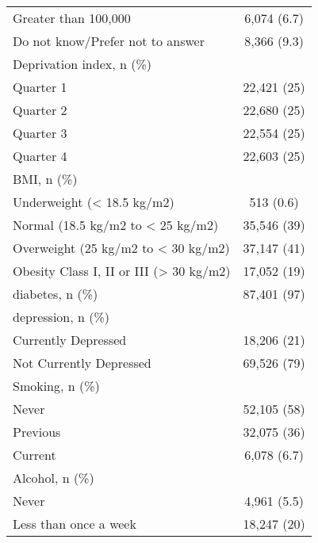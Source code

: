 \begin{tabular}{lc}
\addlinespace
\hspace{1em}Greater than 100,000 & 6,074 (6.7)\\
\hspace{1em}Do not know/Prefer not to answer & 8,366 (9.3)\\
Deprivation index, n (\%) & \\
\hspace{1em}Quarter 1 & 22,421 (25)\\
\hspace{1em}Quarter 2 & 22,680 (25)\\
\addlinespace
\hspace{1em}Quarter 3 & 22,554 (25)\\
\hspace{1em}Quarter 4 & 22,603 (25)\\
BMI, n (\%) & \\
\hspace{1em}Underweight (< 18.5 kg/m2) & 513 (0.6)\\
\hspace{1em}Normal (18.5 kg/m2 to < 25 kg/m2) & 35,546 (39)\\
\addlinespace
\hspace{1em}Overweight (25 kg/m2 to < 30 kg/m2) & 37,147 (41)\\
\hspace{1em}Obesity Class I, II or III (> 30 kg/m2) & 17,052 (19)\\
diabetes, n (\%) & 87,401 (97)\\
depression, n (\%) & \\
\hspace{1em}Currently Depressed & 18,206 (21)\\
\addlinespace
\hspace{1em}Not Currently Depressed & 69,526 (79)\\
Smoking, n (\%) & \\
\hspace{1em}Never & 52,105 (58)\\
\hspace{1em}Previous & 32,075 (36)\\
\hspace{1em}Current & 6,078 (6.7)\\
\addlinespace
Alcohol, n (\%) & \\
\hspace{1em}Never & 4,961 (5.5)\\
\hspace{1em}Less than once a week & 18,247 (20)\\

\end{tabular}
